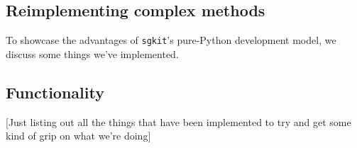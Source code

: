 \documentclass[a4paper,num-refs]{oup-contemporary}
\newcommand{\sgkit}{\texttt{sgkit}}
\begin{document}

\subsection{Reimplementing complex methods}


To showcase the advantages of \sgkit's pure-Python development model, we
discuss some things we've implemented.


\subsection{Functionality}

[Just listing out all the things that have been implemented to try and get
some kind of grip on what we're doing]
\end{document}

